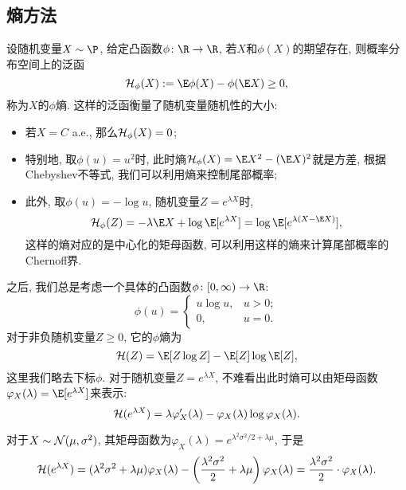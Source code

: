 \subsection{熵方法}
设随机变量$X \sim \P$, 给定凸函数$\phi \colon \R \to \R$, 若$X$和$\phi(X)$的期望存在, 则概率分布空间上的泛函
\begin{equation*}
	\cH_\phi(X) := \E \phi(X) - \phi(\E X) \geq 0, 
\end{equation*}
称为$X$的$\phi$熵. 
这样的泛函衡量了随机变量随机性的大小: 
\begin{itemize}
	\item 若$X = C$ a.e., 那么$\mathcal{H}_\phi (X) = 0$; 
	\item 特别地, 取$\phi(u) = u^2$时, 此时熵$\cH_\phi(X) = \E X^2 - (\E X)^2$就是方差, 根据Chebyshev不等式, 我们可以利用熵来控制尾部概率; 
	\item 此外, 取$\phi(u) = - \log u$, 随机变量$Z = e^{\lambda X}$时, 
		\begin{equation*}
			\cH_\phi(Z) 
			= - \lambda \E X + \log \E[e^{\lambda X}] 
			= \log \E[e^{\lambda(X - \E X)}], 
		\end{equation*}
		这样的熵对应的是中心化的矩母函数, 可以利用这样的熵来计算尾部概率的Chernoff界. 
\end{itemize}

之后, 我们总是考虑一个具体的凸函数$\phi \colon [0, \infty) \to \R$: 
\begin{equation*}
	\phi(u) = 
	\begin{cases}
		u \log u, & u > 0; \\ 0, & u = 0. 
	\end{cases}
\end{equation*}
对于非负随机变量$Z \geq 0$, 它的$\phi$熵为
\begin{equation}
	\cH(Z) = \E[Z \log Z] - \E[Z] \log \E[Z], 
\end{equation}
这里我们略去下标$\phi$. 
对于随机变量$Z = e^{\lambda X}$, 不难看出此时熵可以由矩母函数$\varphi_X(\lambda) = \E[e^{\lambda X}]$来表示: 
\begin{equation}\label{eq:EntropyByMGF}
	\mathcal{H}(e^{\lambda X}) 
	= \lambda \varphi_X'(\lambda) - \varphi_X(\lambda) \log \varphi_X(\lambda). 
\end{equation}

\begin{example}[Gauss随机变量的熵]
	对于$X \sim \mathcal{N}(\mu, \sigma^2)$, 其矩母函数为$\varphi_X(\lambda) = e^{\lambda^2 \sigma^2 / 2 + \lambda \mu}$, 于是
	\begin{equation}\label{eq:EntropyOfGaussianRV}
		\mathcal{H}(e^{\lambda X}) 
		= (\lambda^2 \sigma^2 + \lambda \mu) \varphi_X(\lambda) - \left(\frac{\lambda^2 \sigma^2}{2} + \lambda\mu\right) \varphi_X(\lambda) 
		= \frac{\lambda^2 \sigma^2}{2} \cdot \varphi_X(\lambda). 
	\end{equation}
\end{example}


